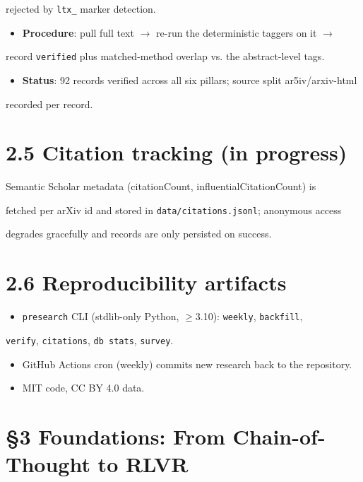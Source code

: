 \documentclass[11pt]{article}
\begin{document}
rejected by \texttt{ltx\_} marker detection.

\begin{itemize}
\item \textbf{Procedure}: pull full text $\rightarrow$ re-run the deterministic taggers on it $\rightarrow$
\end{itemize}
record \texttt{verified} plus matched-method overlap vs. the abstract-level tags.

\begin{itemize}
\item \textbf{Status}: 92 records verified across all six pillars; source split ar5iv/arxiv-html
\end{itemize}
recorded per record.


\section{2.5 Citation tracking (in progress)}

Semantic Scholar metadata (citationCount, influentialCitationCount) is

fetched per arXiv id and stored in \texttt{data/citations.jsonl}; anonymous access

degrades gracefully and records are only persisted on success.


\section{2.6 Reproducibility artifacts}

\begin{itemize}
\item \texttt{presearch} CLI (stdlib-only Python, $\geq$3.10): \texttt{weekly}, \texttt{backfill},
\end{itemize}
\texttt{verify}, \texttt{citations}, \texttt{db stats}, \texttt{survey}.

\begin{itemize}
\item GitHub Actions cron (weekly) commits new research back to the repository.
\item MIT code, CC BY 4.0 data.
\end{itemize}


\section*{\S3 Foundations: From Chain-of-Thought to RLVR}
\end{document}
